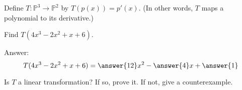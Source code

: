 \documentclass{ximera}
\begin{document}
\begin{problem}
Define $T:\mathbb{P}^3\rightarrow\mathbb{P}^2$ by $T(p(x))=p'(x)$.  (In other words, $T$ maps a polynomial to its derivative.)

\begin{problem}\label{prob:lintransderivative1}
Find $T(4x^3-2x^2+x+6)$.

Answer: $$T(4x^3-2x^2+x+6)=\answer{12}x^2-\answer{4}x+\answer{1}$$
\end{problem}

\begin{problem}\label{prob:lintransderivative2}
Is $T$ a linear transformation?  If so, prove it.  If not, give a counterexample.
\end{problem}
\end{problem}




\end{document}
